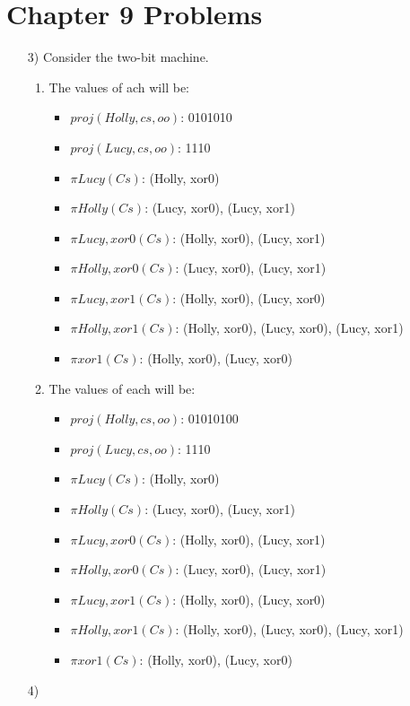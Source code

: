 \documentclass[journal,onecolumn]{IEEEtran}
\begin{document}
\section{Chapter 9 Problems}

\begin{enumerate}
  \item [3)] Consider the two-bit machine.
  \begin{enumerate}
    \item The values of ach will be:
    \begin{itemize}
      \item $proj(Holly,cs,oo)$: 0101010
      \item $proj(Lucy,cs,oo)$: 1110
      \item $\pi Lucy(Cs)$: (Holly, xor0) 
      \item $\pi Holly(Cs)$: (Lucy, xor0), (Lucy, xor1)
      \item $\pi Lucy,xor0(Cs)$: (Holly, xor0), (Lucy, xor1)
      \item $\pi Holly,xor0(Cs)$: (Lucy, xor0), (Lucy, xor1)
      \item $\pi Lucy,xor1(Cs)$: (Holly, xor0), (Lucy, xor0)
      \item $\pi Holly,xor1(Cs)$: (Holly, xor0), (Lucy, xor0), (Lucy, xor1)
      \item $\pi xor1(Cs)$: (Holly, xor0), (Lucy, xor0)
    \end{itemize}
    \item The values of each will be:
    \begin{itemize}
      \item $proj(Holly,cs,oo)$: 01010100
      \item $proj(Lucy,cs,oo)$: 1110
      \item $\pi Lucy(Cs)$: (Holly, xor0) 
      \item $\pi Holly(Cs)$: (Lucy, xor0), (Lucy, xor1)
      \item $\pi Lucy,xor0(Cs)$: (Holly, xor0), (Lucy, xor1)
      \item $\pi Holly,xor0(Cs)$: (Lucy, xor0), (Lucy, xor1)
      \item $\pi Lucy,xor1(Cs)$: (Holly, xor0), (Lucy, xor0)
      \item $\pi Holly,xor1(Cs)$: (Holly, xor0), (Lucy, xor0), (Lucy, xor1)
      \item $\pi xor1(Cs)$: (Holly, xor0), (Lucy, xor0)
    \end{itemize}
  \end{enumerate}
  \item [4)]

\end{enumerate}
\end{document}
